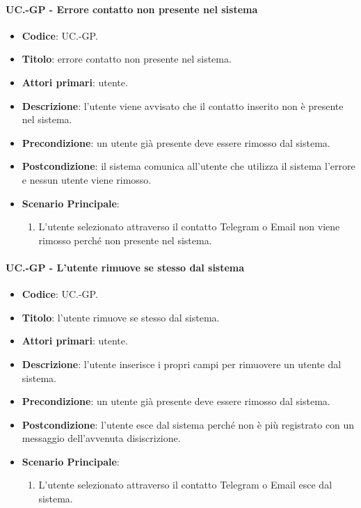 			\paragraph{UC\theuccount.\thesubuccount-GP - Errore contatto non presente nel sistema}
					
				\begin{itemize}
					\item \textbf{Codice}: UC\theuccount.\thesubuccount-GP.
					\item \textbf{Titolo}: errore contatto non presente nel sistema.
					\item \textbf{Attori primari}: utente.
					\item \textbf{Descrizione}: l’utente viene avvisato che il contatto inserito non è presente nel sistema.
					\item \textbf{Precondizione}: un utente già presente deve essere rimosso dal sistema.
					\item \textbf{Postcondizione}: il sistema comunica all’utente che utilizza il sistema l’errore e nessun utente viene rimosso.
					\item \textbf{Scenario Principale}:
					\begin{enumerate}
						\item L'utente selezionato attraverso il contatto Telegram o Email non viene rimosso perché non presente nel sistema.
					\end{enumerate}
				\end{itemize}
			
			\paragraph{UC\theuccount.\thesubuccount-GP - L'utente rimuove se stesso dal sistema}
			
			\begin{itemize}
				\item \textbf{Codice}: UC\theuccount.\thesubuccount-GP.
				\item \textbf{Titolo}: l'utente rimuove se stesso dal sistema.
				\item \textbf{Attori primari}: utente.
				\item \textbf{Descrizione}:  l’utente inserisce i propri campi per rimuovere un utente dal sistema.
				\item \textbf{Precondizione}: un utente già presente deve essere rimosso dal sistema.
				\item \textbf{Postcondizione}:  l'utente esce dal sistema perché non è più registrato con un messaggio dell'avvenuta disiscrizione.
				\item \textbf{Scenario Principale}:
				\begin{enumerate}
					\item L'utente selezionato attraverso il contatto Telegram o Email esce dal sistema.
				\end{enumerate}
			\end{itemize}